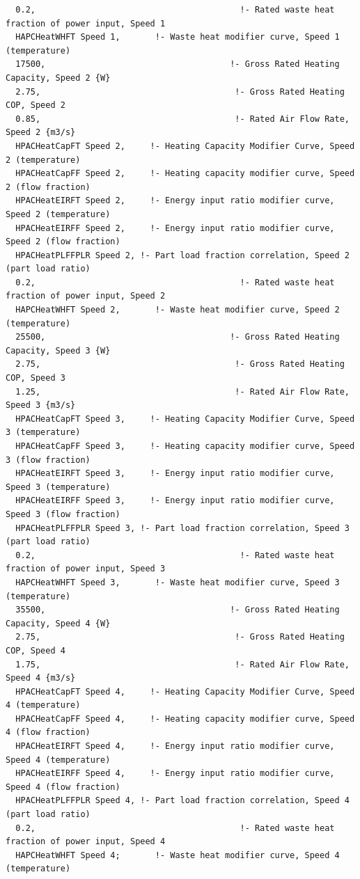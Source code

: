 \begin{lstlisting}
  0.2,                                         !- Rated waste heat fraction of power input, Speed 1
  HAPCHeatWHFT Speed 1,       !- Waste heat modifier curve, Speed 1 (temperature)
  17500,                                     !- Gross Rated Heating Capacity, Speed 2 {W}
  2.75,                                       !- Gross Rated Heating COP, Speed 2
  0.85,                                       !- Rated Air Flow Rate, Speed 2 {m3/s}
  HPACHeatCapFT Speed 2,     !- Heating Capacity Modifier Curve, Speed 2 (temperature)
  HPACHeatCapFF Speed 2,     !- Heating capacity modifier curve, Speed 2 (flow fraction)
  HPACHeatEIRFT Speed 2,     !- Energy input ratio modifier curve, Speed 2 (temperature)
  HPACHeatEIRFF Speed 2,     !- Energy input ratio modifier curve, Speed 2 (flow fraction)
  HPACHeatPLFFPLR Speed 2, !- Part load fraction correlation, Speed 2 (part load ratio)
  0.2,                                         !- Rated waste heat fraction of power input, Speed 2
  HAPCHeatWHFT Speed 2,       !- Waste heat modifier curve, Speed 2 (temperature)
  25500,                                     !- Gross Rated Heating Capacity, Speed 3 {W}
  2.75,                                       !- Gross Rated Heating COP, Speed 3
  1.25,                                       !- Rated Air Flow Rate, Speed 3 {m3/s}
  HPACHeatCapFT Speed 3,     !- Heating Capacity Modifier Curve, Speed 3 (temperature)
  HPACHeatCapFF Speed 3,     !- Heating capacity modifier curve, Speed 3 (flow fraction)
  HPACHeatEIRFT Speed 3,     !- Energy input ratio modifier curve, Speed 3 (temperature)
  HPACHeatEIRFF Speed 3,     !- Energy input ratio modifier curve, Speed 3 (flow fraction)
  HPACHeatPLFFPLR Speed 3, !- Part load fraction correlation, Speed 3 (part load ratio)
  0.2,                                         !- Rated waste heat fraction of power input, Speed 3
  HAPCHeatWHFT Speed 3,       !- Waste heat modifier curve, Speed 3 (temperature)
  35500,                                     !- Gross Rated Heating Capacity, Speed 4 {W}
  2.75,                                       !- Gross Rated Heating COP, Speed 4
  1.75,                                       !- Rated Air Flow Rate, Speed 4 {m3/s}
  HPACHeatCapFT Speed 4,     !- Heating Capacity Modifier Curve, Speed 4 (temperature)
  HPACHeatCapFF Speed 4,     !- Heating capacity modifier curve, Speed 4 (flow fraction)
  HPACHeatEIRFT Speed 4,     !- Energy input ratio modifier curve, Speed 4 (temperature)
  HPACHeatEIRFF Speed 4,     !- Energy input ratio modifier curve, Speed 4 (flow fraction)
  HPACHeatPLFFPLR Speed 4, !- Part load fraction correlation, Speed 4 (part load ratio)
  0.2,                                         !- Rated waste heat fraction of power input, Speed 4
  HAPCHeatWHFT Speed 4;       !- Waste heat modifier curve, Speed 4 (temperature)
\end{lstlisting}

